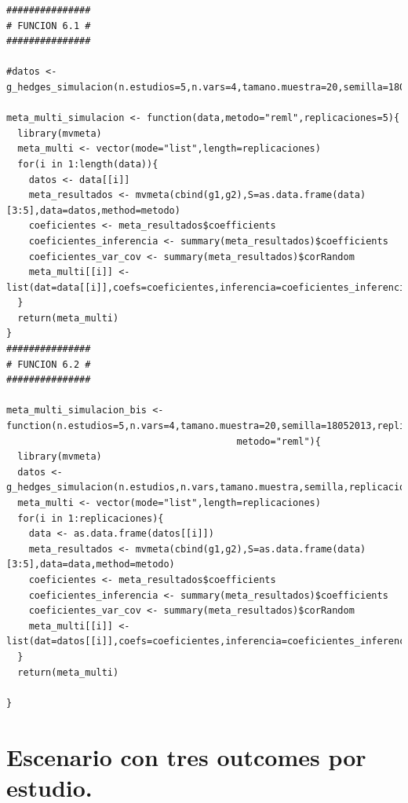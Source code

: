 \documentclass[a4paper,openright,12pt]{report}
\begin{document}
{\begin{verbatim}
###############
# FUNCION 6.1 #
###############

#datos <- g_hedges_simulacion(n.estudios=5,n.vars=4,tamano.muestra=20,semilla=18052013,replicaciones=5,correlacion=0)

meta_multi_simulacion <- function(data,metodo="reml",replicaciones=5){
  library(mvmeta)
  meta_multi <- vector(mode="list",length=replicaciones)
  for(i in 1:length(data)){
    datos <- data[[i]]
    meta_resultados <- mvmeta(cbind(g1,g2),S=as.data.frame(data)[3:5],data=datos,method=metodo)
    coeficientes <- meta_resultados$coefficients
    coeficientes_inferencia <- summary(meta_resultados)$coefficients
    coeficientes_var_cov <- summary(meta_resultados)$corRandom
    meta_multi[[i]] <- list(dat=data[[i]],coefs=coeficientes,inferencia=coeficientes_inferencia,var_cov=coeficientes_var_cov)
  }
  return(meta_multi)  
}
###############
# FUNCION 6.2 #
###############

meta_multi_simulacion_bis <- function(n.estudios=5,n.vars=4,tamano.muestra=20,semilla=18052013,replicaciones=5,correlacion=0,
                                         metodo="reml"){
  library(mvmeta)
  datos <- g_hedges_simulacion(n.estudios,n.vars,tamano.muestra,semilla,replicaciones,correlacion)
  meta_multi <- vector(mode="list",length=replicaciones)
  for(i in 1:replicaciones){
    data <- as.data.frame(datos[[i]])
    meta_resultados <- mvmeta(cbind(g1,g2),S=as.data.frame(data)[3:5],data=data,method=metodo)
    coeficientes <- meta_resultados$coefficients
    coeficientes_inferencia <- summary(meta_resultados)$coefficients
    coeficientes_var_cov <- summary(meta_resultados)$corRandom
    meta_multi[[i]] <- list(dat=datos[[i]],coefs=coeficientes,inferencia=coeficientes_inferencia,var_cov=coeficientes_var_cov)
  }
  return(meta_multi)  
  
}
\end{verbatim}}

\section{Escenario con tres outcomes por estudio.}
\end{document}
